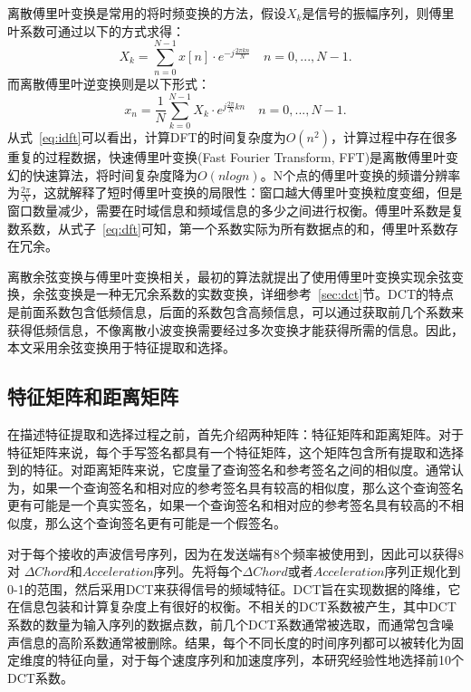 离散傅里叶变换是常用的将时频变换的方法，假设$X_{k}$是信号的振幅序列，则傅里叶系数可通过以下的方式求得：
\begin{equation}
X_{k} = \sum_{n=0}^{N-1}x[n] \cdot e^{-j\frac{2\pi kn}{N}} \quad n=0,...,N-1.  \label{eq:dft}
\end{equation}
而离散傅里叶逆变换则是以下形式：
\begin{equation}
 x_{n} = \frac{1}{N}\sum_{k=0}^{N-1}X_{k} \cdot e^{j\frac{2\pi}{N}kn} \quad n=0,...,N-1. \label{eq:idft}
\end{equation}
从式~\ref{eq:idft}可以看出，计算DFT的时间复杂度为$O(n^{2})$，计算过程中存在很多重复的过程数据，快速傅里叶变换(Fast Fourier Transform, FFT)是离散傅里叶变幻的快速算法，将时间复杂度降为$O(nlog n)$。N个点的傅里叶变换的频谱分辨率为$\frac{2\pi}{N}$，这就解释了短时傅里叶变换的局限性：窗口越大傅里叶变换粒度变细，但是窗口数量减少，需要在时域信息和频域信息的多少之间进行权衡。傅里叶系数是复数系数，从式子~\ref{eq:dft}可知，第一个系数实际为所有数据点的和，傅里叶系数存在冗余。

离散余弦变换与傅里叶变换相关，最初的算法就提出了使用傅里叶变换实现余弦变换，余弦变换是一种无冗余系数的实数变换，详细参考~\ref{sec:dct}节。DCT的特点是前面系数包含低频信息，后面的系数包含高频信息，可以通过获取前几个系数来获得低频信息，不像离散小波变换需要经过多次变换才能获得所需的信息。因此，本文采用余弦变换用于特征提取和选择。

\subsection{特征矩阵和距离矩阵}  \label{sec:feature-distance-matrix}
在描述特征提取和选择过程之前，首先介绍两种矩阵：特征矩阵和距离矩阵。对于特征矩阵来说，每个手写签名都具有一个特征矩阵，这个矩阵包含所有提取和选择到的特征。对距离矩阵来说，它度量了查询签名和参考签名之间的相似度。通常认为，如果一个查询签名和相对应的参考签名具有较高的相似度，那么这个查询签名更有可能是一个真实签名，如果一个查询签名和相对应的参考签名具有较高的不相似度，那么这个查询签名更有可能是一个假签名。

对于每个接收的声波信号序列，因为在发送端有8个频率被使用到，因此可以获得8对 $\Delta Chord$和$Acceleration$序列。先将每个$\Delta Chord$或者$Acceleration$序列正规化到0-1的范围，然后采用DCT来获得信号的频域特征。DCT旨在实现数据的降维，它在信息包装和计算复杂度上有很好的权衡。不相关的DCT系数被产生，其中DCT系数的数量为输入序列的数据点数，前几个DCT系数通常被选取，而通常包含噪声信息的高阶系数通常被删除。结果，每个不同长度的时间序列都可以被转化为固定维度的特征向量，对于每个速度序列和加速度序列，本研究经验性地选择前10个DCT系数。

